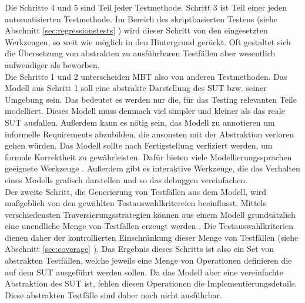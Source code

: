 Die Schritte 4 und 5 sind Teil jeder Testmethode. Schritt 3 ist Teil einer jeden automatisierten Testmethode. Im Bereich des skriptbasierten Testens (siehe Abschnitt \ref{sec:regressionstests} ) wird dieser Schritt von den eingesetzten Werkzeugen, so weit wie möglich in den Hintergrund gerückt. Oft gestaltet sich die Übersetzung von abstrakten zu ausführbaren Testfällen aber wesentlich aufwendiger als beworben\cite{graham_experiences_2012}.\\
Die Schritte 1 und 2 unterscheiden \Gls{MBT} also von anderen Testmethoden. Das Modell aus Schritt 1 soll eine abstrakte Darstellung des \Gls{SUT} bzw. seiner Umgebung sein. Das bedeutet es werden nur die, für das Testing relevanten Teile modelliert. Dieses Modell muss demnach viel simpler und kleiner als das reale \Gls{SUT} ausfallen. Außerdem kann es nötig sein, das Modell zu annotieren um informelle Requirements abzubilden, die ansonsten mit der Abstraktion verloren gehen würden. Das Modell sollte nach Fertigstellung verfiziert werden, um formale Korrektheit zu gewährleisten. Dafür bieten viele Modellierungssprachen geeignete Werkzeuge \cite{kaneiwa_consistency_2006}. Außerdem gibt es interaktive Werkzeuge, die das Verhalten eines Modells grafisch darstellen und so das debuggen vereinfachen.\\
Der zweite Schritt, die Generierung von Testfällen aus dem Modell, wird maßgeblich von den gewählten Testauswahlkritereien beeinflusst. Mittels verschiedensten Traversierungsstrategien können aus einem Modell grundsätzlich eine unendliche Menge von Testfällen erzeugt werden \cite{utting_practical_2007}. Die Testauswahlkriterien dienen daher der kontrollierten Einschränkung dieser Menge von Testfällen (siehe Abschnitt \ref{sec:coverage} ). Das Ergebnis dieses Schritts ist also ein Set von abstrakten Testfällen, welche jeweils eine Menge von Operationen definieren die auf dem \Gls{SUT} ausgeführt werden sollen. Da das Modell aber eine vereinfachte Abstraktion des \Gls{SUT} ist, fehlen diesen Operationen die Implementierungsdetails. Diese abstrakten Testfälle sind daher noch nicht ausführbar.\\

